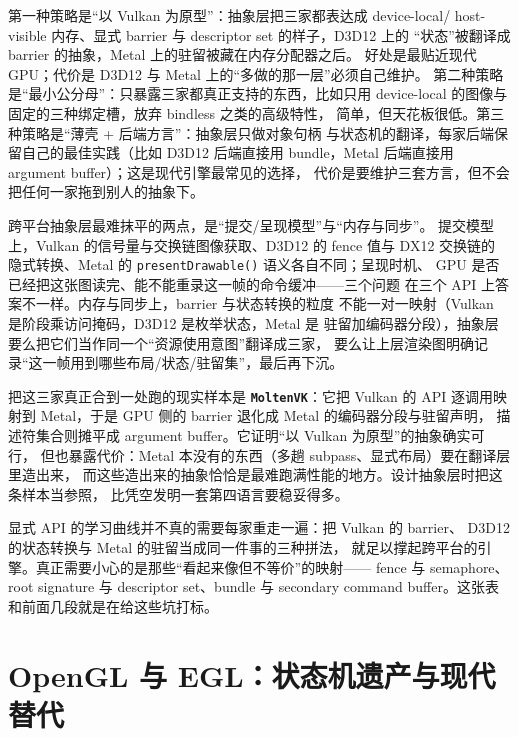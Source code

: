 \documentclass[12pt,a4paper,fontset=fandol]{ctexbook}
\newcommand{\Fn}[1]{\texttt{#1()}}
\newcommand{\Bk}{\discretionary{}{}{}}
\newcommand{\Lib}[1]{\textbf{\texttt{#1}}}
\newcommand{\Lang}[1]{\textsf{#1}}
\newcommand{\DomGPU}{\Lang{GPU}}
\begin{document}
\begin{compare}[title={跨平台抽象层的三条常见策略}]
第一种策略是``以 Vulkan 为原型''：抽象层把三家都表达成 device-local/
host-visible 内存、显式 barrier 与 descriptor set 的样子，D3D12 上的
``状态''被翻译成 barrier 的抽象，Metal 上的驻留被藏在内存分配器之后。
好处是最贴近现代 \DomGPU{}；代价是 D3D12 与 Metal 上的``多做的那一层''必须自己维护。
第二种策略是``最小公分母''：只暴露三家都真正支持的东西，比如只用
device-local 的图像与固定的三种绑定槽，放弃 bindless 之类的高级特性，
简单，但天花板很低。第三种策略是``薄壳 + 后端方言''：抽象层只做对象句柄
与状态机的翻译，每家后端保留自己的最佳实践（比如 D3D12 后端直接用
bundle，Metal 后端直接用 argument buffer）；这是现代引擎最常见的选择，
代价是要维护三套方言，但不会把任何一家拖到别人的抽象下。
\end{compare}

跨平台抽象层最难抹平的两点，是``提交/呈现模型''与``内存与同步''。
提交模型上，Vulkan 的信号量与交换链图像获取、D3D12 的 fence 值与 DX12 交换链的
隐式转换、Metal 的 \Fn{present\Bk Drawable} 语义各自不同；呈现时机、
\DomGPU{} 是否已经把这张图读完、能不能重录这一帧的命令缓冲——三个问题
在三个 API 上答案不一样。内存与同步上，barrier 与状态转换的粒度
不能一对一映射（Vulkan 是阶段乘访问掩码，D3D12 是枚举状态，Metal 是
驻留加编码器分段），抽象层要么把它们当作同一个``资源使用意图''翻译成三家，
要么让上层渲染图明确记录``这一帧用到哪些布局/状态/驻留集''，最后再下沉。

把这三家真正合到一处跑的现实样本是 \Lib{MoltenVK}：它把 Vulkan 的 API 逐调用映射到
Metal，于是 \DomGPU{} 侧的 barrier 退化成 Metal 的编码器分段与驻留声明，
描述符集合则摊平成 argument buffer。它证明``以 Vulkan 为原型''的抽象确实可行，
但也暴露代价：Metal 本没有的东西（多趟 subpass、显式布局）要在翻译层里造出来，
而这些造出来的抽象恰恰是最难跑满性能的地方。设计抽象层时把这条样本当参照，
比凭空发明一套第四语言要稳妥得多。

\begin{guideline}[title={学一套就够，另两套读概念表就够了}]
显式 API 的学习曲线并不真的需要每家重走一遍：把 Vulkan 的 barrier、
D3D12 的状态转换与 Metal 的驻留当成同一件事的三种拼法，
就足以撑起跨平台的引擎。真正需要小心的是那些``看起来像但不等价''的映射——
fence 与 semaphore、root signature 与 descriptor set、bundle 与 secondary
command buffer。这张表和前面几段就是在给这些坑打标。
\end{guideline}

\chapter{OpenGL 与 EGL：状态机遗产与现代替代}
\label{ch:ch11-gl-legacy}
\end{document}

